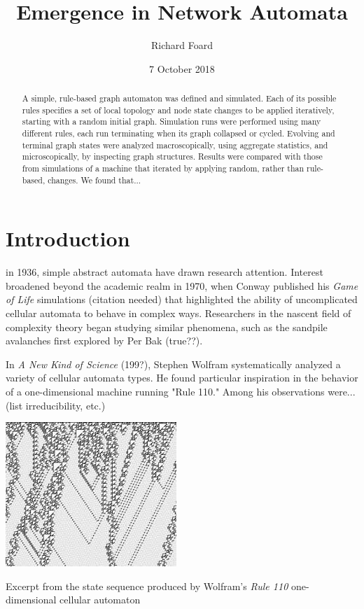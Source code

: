 \documentclass{tufte-handout}
\title{Emergence in Network Automata}
\author{Richard Foard}
\date{7 October 2018}  %
\begin{document}
\maketitle%


\begin{abstract}
\noindent A simple, rule-based
graph automaton was defined and simulated. Each of its possible rules specifies a set
of local topology and node state changes to be applied iteratively, starting with a random initial graph.
Simulation runs were performed using many different rules, each run terminating when its graph
collapsed or cycled.
Evolving and terminal graph states were analyzed macroscopically, using
aggregate statistics, and microscopically, by inspecting graph structures.
Results were compared with those from simulations of a machine that
iterated by applying random, rather than rule-based, changes. We found that...
\end{abstract}

\section{Introduction}

 in 1936, simple abstract automata have drawn research attention.
Interest broadened beyond the academic realm in 1970,
when Conway published his \textit{Game of Life} simulations (citation needed) that highlighted the ability
of uncomplicated cellular automata to behave in complex ways. Researchers in the
nascent field of complexity theory began studying similar phenomena, such as the
sandpile avalanches first explored by Per Bak (true??).

In \textit{A New Kind of Science} (199?), Stephen Wolfram systematically analyzed
a variety of cellular automata types. He found particular inspiration in the
behavior of a one-dimensional machine running "Rule 110." Among his observations were... (list
irreducibility, etc.)

\begin{marginfigure}
\includegraphics{rule110.jpeg}
\caption{Excerpt from the state sequence produced by Wolfram's \textit{Rule 110}
one-dimensional cellular automaton}
\end{marginfigure}
\end{document}
